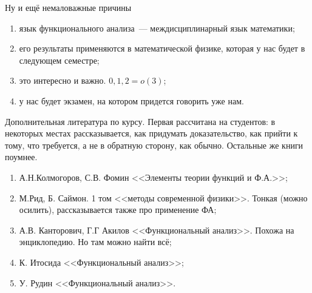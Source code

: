 \documentclass[document]{subfiles}
\begin{document}
Ну и ещё немаловажные причины
\begin{enumerate}
    \item язык функционального анализа~--- междисциплинарный язык математики;
    \item его результаты применяются в математической физике, которая у нас будет в следующем семестре;
    \item это интересно и важно.  $0,1,2 = o(3)$;
    \item у нас будет экзамен, на котором придется говорить уже нам.
\end{enumerate}

Дополнительная литература по курсу. Первая рассчитана на студентов: в некоторых местах рассказывается, как придумать доказательство, как прийти к тому, что требуется,
а не в обратную сторону, как обычно. Остальные же книги поумнее.
\
\begin{enumerate}
    \item А.Н.Колмогоров, С.В. Фомин <<Элементы теории функций и Ф.А.>>;
    \item М.Рид, Б. Саймон. 1 том <<методы современной физики>>. Тонкая (можно осилить), рассказывается также про применение ФА;
    \item А.В. Канторович, Г.Г Акилов <<Функциональный анализ>>. Похожа на энциклопедию. Но там можно найти всё;
    \item К. Итосида <<Функциональный анализ>>;
    \item У. Рудин <<Функциональный анализ>>.
\end{enumerate}
\end{document}
